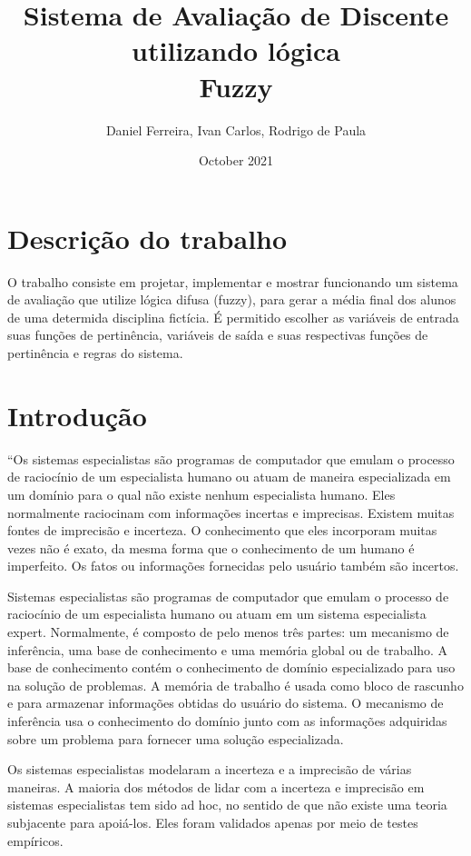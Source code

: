 \documentclass{article}
\title{%
  Sistema de Avaliação de Discente\\
  \large utilizando lógica\\
    Fuzzy}
\author{Daniel Ferreira, Ivan Carlos, Rodrigo de Paula}
\date{October 2021}
\begin{document}
\maketitle

\section{Descrição do trabalho}

O trabalho consiste em projetar, implementar e mostrar
funcionando um sistema de avaliação que utilize lógica difusa
(fuzzy), para gerar a média final dos alunos de uma determida
disciplina fictícia. É permitido escolher as variáveis de
entrada suas funções de pertinência, variáveis de saída e
suas respectivas funções de pertinência e regras do sistema.

\section{Introdução}

``Os sistemas especialistas são programas de computador que
emulam o processo de raciocínio de um especialista humano ou
atuam de maneira especializada em um domínio para o qual não
existe nenhum especialista humano. Eles normalmente raciocinam
com informações incertas e imprecisas. Existem muitas fontes
de imprecisão e incerteza. O conhecimento que eles incorporam
muitas vezes não é exato, da mesma forma que o conhecimento de
um humano é imperfeito. Os fatos ou informações fornecidas
pelo usuário também são incertos.

Sistemas especialistas são programas de computador que emulam
o processo de raciocínio de um especialista humano ou atuam
em um sistema especialista expert. Normalmente, é composto de
pelo menos três partes: um mecanismo de inferência, uma base
de conhecimento e uma memória global ou de trabalho. A base de
conhecimento contém o conhecimento de domínio especializado
para uso na solução de problemas. A memória de trabalho é
usada como bloco de rascunho e para armazenar informações
obtidas do usuário do sistema. O mecanismo de inferência usa o
conhecimento do domínio junto com as informações adquiridas
sobre um problema para fornecer uma solução especializada.

Os sistemas especialistas modelaram a incerteza e a imprecisão
de várias maneiras. A maioria dos métodos de lidar com a
incerteza e imprecisão em sistemas especialistas tem sido ad
hoc, no sentido de que não existe uma teoria subjacente para
apoiá-los. Eles foram validados apenas por meio de testes
empíricos.
\end{document}
